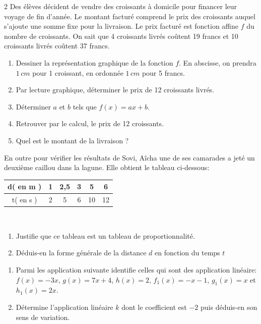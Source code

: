 \begin{multicols*}{2}
   Des élèves décident de vendre des croissants à domicile pour financer leur voyage de fin d'année. Le montant facturé comprend le prix des croissants auquel s'ajoute une somme fixe pour la livraison. Le prix facturé est fonction affine $f$ du nombre de croissants.
  On sait que 4 croissants livrés coûtent 19 francs et 10 croissants livrés coûtent 37 francs.
  \begin{enumerate}
  	\item Dessiner la représentation graphique de la fonction $f$. En abscisse, on prendra $1\,cm$ pour 1 croissant, en ordonnée $1\,cm$ pour 5 francs.
  	\item Par lecture graphique, déterminer le prix de 12 croissants livrés.
  	\item Déterminer $a$ et $b$ tels que $f(x) = ax+b$.
  	\item Retrouver par le calcul, le prix de 12 croissants.
  	\item Quel est le montant de la livraison ?
  \end{enumerate}
  
 	\setcounter{q}{0}
 	En outre pour vérifier les résultats de Sovi, Aîcha une de ses camarades a jeté un deuxième caillou dans la lagune. Elle obtient le tableau ci-dessous:
 	
 	\begin{tabular}{|c|c|c|c|c|c|}
 		\hline 
 		d( en m )	& 1 &2,5  & 3 & 5 & 6 \\ 
 		\hline 
 		t( en s )	&  2&  5&6  &10  &12  \\ 
 		\hline 
 	\end{tabular} \\
 	
 	\begin{enumerate}
 		\item Justifie que ce tableau est un tableau de proportionnalité.
 		\item Déduis-en la forme générale de la distance $d$ en fonction du temps $t$
 	\end{enumerate}
 	\dures
 	 
 	\begin{enumerate}
 		\item  Parmi les application suivante identifie celles qui sont des application linéaire: $ f(x)=-3x $, $ g(x)=7x+4 $, $ h(x)=2$, $ f_1(x)=-x-1 $, $ g_1(x)=x $ et $ h_1(x)=2x$.
 		\item  Détermine l'application linéaire $k$ dont le coefficient est $ -2 $ puis déduis-en son sens de variation.
 	\end{enumerate}
 	\dures 
 	

\end{multicols*}
